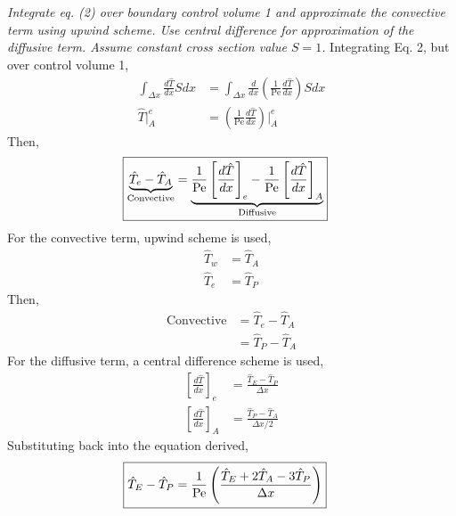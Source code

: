 \section{}
\textit{Integrate eq. (2) over boundary control volume 1 and approximate the convective term using upwind scheme. Use central difference for approximation of the diffusive term. Assume constant cross section value $S = 1$.}
Integrating Eq. 2, but over control volume 1,
\begin{align*}
    \int_{\Delta x} \frac{d \hat{T}}{dx} S dx &= \int_{\Delta x} \frac{d}{dx}\left(\frac{1}{\text{Pe}} \frac{d \hat{T}}{dx}\right) S dx \\
    \hat{T} \bigg|_{A}^{e} &= \left(\frac{1}{\text{Pe}} \frac{d \hat{T}}{dx}\right) \bigg|_{A}^{e}
\end{align*}
Then,
\begin{align*}
    \Aboxed{\underbrace{\hat{T}_e - \hat{T}_A}_{\text{Convective}} &= \underbrace{\frac{1}{\text{Pe}} \left[\frac{d \hat{T}}{dx}\right]_e - \frac{1}{\text{Pe}} \left[\frac{d \hat{T}}{dx}\right]_A}_{\text{Diffusive}}}
\end{align*}
For the convective term, upwind scheme is used,
\begin{align*}
    \hat{T}_w &= \hat{T}_A \\
    \hat{T}_e &= \hat{T}_P
\end{align*}
Then,
\begin{align*}
    \text{Convective} &= \hat{T}_e - \hat{T}_A \\
    &= \hat{T}_P - \hat{T}_A
\end{align*}
For the diffusive term, a central difference scheme is used,
\begin{align*}
    \left[\frac{d \hat{T}}{dx}\right]_e &= \frac{\hat{T}_E - \hat{T}_P}{\Delta x} \\
    \left[\frac{d \hat{T}}{dx}\right]_A &= \frac{\hat{T}_P - \hat{T}_A}{\Delta x/2}
\end{align*}
Substituting back into the equation derived,
\begin{align*}
    \Aboxed{\hat{T}_E - \hat{T}_P &= \frac{1}{\text{Pe}} \left(\frac{\hat{T}_E + 2 \hat{T}_A - 3 \hat{T}_P}{\Delta x}\right)} 
\end{align*}